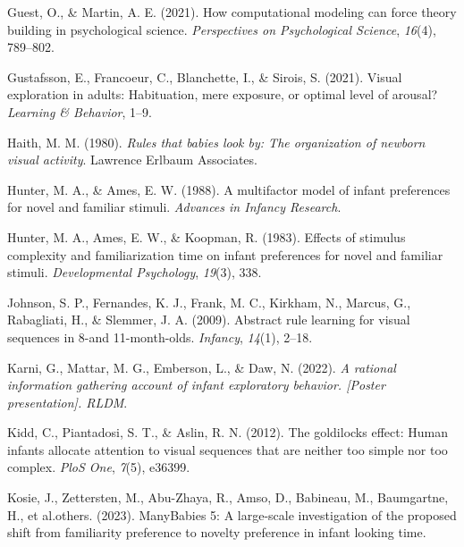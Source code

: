 \documentclass[10pt, letterpaper]{article}
\newenvironment{CSLReferences}%
  {}%
  {\par}
\begin{document}
\begin{CSLReferences}{1}{0}
\leavevmode{}%
Guest, O., \& Martin, A. E. (2021). How computational modeling can force
theory building in psychological science. \emph{Perspectives on
Psychological Science}, \emph{16}(4), 789--802.

\leavevmode{}%
Gustafsson, E., Francoeur, C., Blanchette, I., \& Sirois, S. (2021).
Visual exploration in adults: Habituation, mere exposure, or optimal
level of arousal? \emph{Learning \& Behavior}, 1--9.

\leavevmode{}%
Haith, M. M. (1980). \emph{Rules that babies look by: The organization
of newborn visual activity}. Lawrence Erlbaum Associates.

\leavevmode{}%
Hunter, M. A., \& Ames, E. W. (1988). A multifactor model of infant
preferences for novel and familiar stimuli. \emph{Advances in Infancy
Research}.

\leavevmode{}%
Hunter, M. A., Ames, E. W., \& Koopman, R. (1983). Effects of stimulus
complexity and familiarization time on infant preferences for novel and
familiar stimuli. \emph{Developmental Psychology}, \emph{19}(3), 338.

\leavevmode{}%
Johnson, S. P., Fernandes, K. J., Frank, M. C., Kirkham, N., Marcus, G.,
Rabagliati, H., \& Slemmer, J. A. (2009). Abstract rule learning for
visual sequences in 8-and 11-month-olds. \emph{Infancy}, \emph{14}(1),
2--18.

\leavevmode{}%
Karni, G., Mattar, M. G., Emberson, L., \& Daw, N. (2022). \emph{A
rational information gathering account of infant exploratory behavior.
{[}Poster presentation{]}. RLDM}.

\leavevmode{}%
Kidd, C., Piantadosi, S. T., \& Aslin, R. N. (2012). The goldilocks
effect: Human infants allocate attention to visual sequences that are
neither too simple nor too complex. \emph{PloS One}, \emph{7}(5),
e36399.

\leavevmode{}%
Kosie, J., Zettersten, M., Abu-Zhaya, R., Amso, D., Babineau, M.,
Baumgartne, H., et al.others. (2023). ManyBabies 5: A large-scale
investigation of the proposed shift from familiarity preference to
novelty preference in infant looking time.


\end{CSLReferences}
\end{document}
